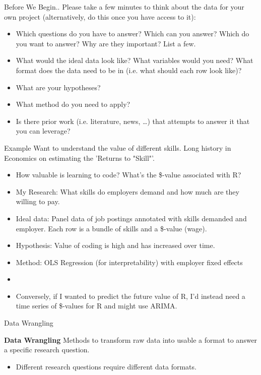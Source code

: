\documentclass[12pt,aspectratio=169]{beamer}
\begin{document}
\begin{frame}{Before We Begin..}
 Please take a few minutes to think about the data for your own project (alternatively, do this once you have access to it):
\begin{itemize}
    \item<1-> Which questions do you have to answer? Which can you answer? Which do you want to answer? Why are they important? List a few.
    \item<2-> What would the ideal data look like? What variables would you need? What format does the data need to be in (i.e. what should each row look like)?
    \item<3-> What are your hypotheses?
    \item<4-> What method do you need to apply?
    \item<5-> Is there prior work (i.e. literature, news, \dots) that attempts to answer it that you can leverage?
\end{itemize}
\end{frame}

\begin{frame}{Example}
Want to understand the value of different skills.
Long history in Economics on estimating the 'Returns to "Skill"'.
    \begin{itemize}
        \item How valuable is learning to code? What's the \$-value associated with R?
        \item My Research: What skills do employers demand and how much are they willing to pay.
        \item Ideal data: Panel data of job postings annotated with skills demanded and employer. Each row is a bundle of skills and a \$-value (wage).
        \item Hypothesis: Value of coding is high and has increased over time.
        \item Method: OLS Regression (for interpretability) with employer fixed effects
        \item[]
        \item Conversely, if I wanted to predict the future value of R, I'd instead need a time series of \$-values for R and might use ARIMA.
    \end{itemize}
\end{frame}

\begin{frame}{Data Wrangling}
\begin{block}{\textbf{Data Wrangling}}
Methods to transform raw data into usable a format to answer a specific research question.
\end{block}
\begin{itemize}
    \item Different research questions require different data formats.
\end{itemize}
\end{frame}
\end{document}
